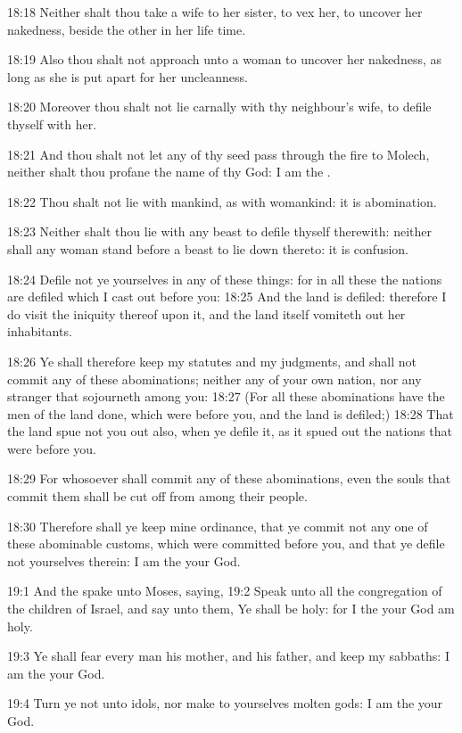 18:18 Neither shalt thou take a wife to her sister, to vex her, to
uncover her nakedness, beside the other in her life time.

18:19 Also thou shalt not approach unto a woman to uncover her
nakedness, as long as she is put apart for her uncleanness.

18:20 Moreover thou shalt not lie carnally with thy neighbour's wife,
to defile thyself with her.

18:21 And thou shalt not let any of thy seed pass through the fire to
Molech, neither shalt thou profane the name of thy God: I am the \LORD.

18:22 Thou shalt not lie with mankind, as with womankind: it is
abomination.

18:23 Neither shalt thou lie with any beast to defile thyself
therewith: neither shall any woman stand before a beast to lie down
thereto: it is confusion.

18:24 Defile not ye yourselves in any of these things: for in all
these the nations are defiled which I cast out before you: 18:25 And
the land is defiled: therefore I do visit the iniquity thereof upon
it, and the land itself vomiteth out her inhabitants.

18:26 Ye shall therefore keep my statutes and my judgments, and shall
not commit any of these abominations; neither any of your own nation,
nor any stranger that sojourneth among you: 18:27 (For all these
abominations have the men of the land done, which were before you, and
the land is defiled;) 18:28 That the land spue not you out also, when
ye defile it, as it spued out the nations that were before you.

18:29 For whosoever shall commit any of these abominations, even the
souls that commit them shall be cut off from among their people.

18:30 Therefore shall ye keep mine ordinance, that ye commit not any
one of these abominable customs, which were committed before you, and
that ye defile not yourselves therein: I am the \LORD your God.

19:1 And the \LORD spake unto Moses, saying, 19:2 Speak unto all the
congregation of the children of Israel, and say unto them, Ye shall be
holy: for I the \LORD your God am holy.

19:3 Ye shall fear every man his mother, and his father, and keep my
sabbaths: I am the \LORD your God.

19:4 Turn ye not unto idols, nor make to yourselves molten gods: I am
the \LORD your God.

